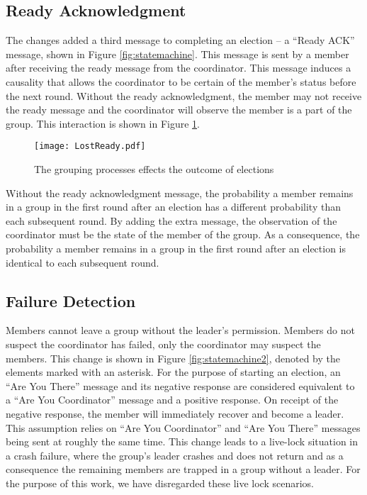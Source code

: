 \subsection{Ready Acknowledgment}

The changes added a third message to completing an election -- a ``Ready ACK'' message, shown in Figure \ref{fig:statemachine}.
This message is sent by a member after receiving the ready message from the coordinator.
This message induces a causality that allows the coordinator to be certain of the member's status before the next round.
Without the ready acknowledgment, the member may not receive the ready message and the coordinator will observe the member is a part of the group.
This interaction is shown in Figure \ref{fig:lostready}.

\begin{figure}
\texttt{[image: LostReady.pdf]}
\caption{The grouping processes effects the outcome of elections} \label{fig:lostready}
\end{figure}

Without the ready acknowledgment message, the probability a member remains in a group in the first round after an election has a different probability than each subsequent round.
By adding the extra message, the observation of the coordinator must be the state of the member of the group.
As a consequence, the probability a member remains in a group in the first round after an election is identical to each subsequent round.

\subsection{Failure Detection}

Members cannot leave a group without the leader's permission.
Members do not suspect the coordinator has failed, only the coordinator may suspect the members.
This change is shown in Figure \ref{fig:statemachine2}, denoted by the elements marked with an asterisk.
For the purpose of starting an election, an ``Are You There'' message and its negative response are considered equivalent to a ``Are You Coordinator'' message and a positive response.
On receipt of the negative response, the member will immediately recover and become a leader.
This assumption relies on ``Are You Coordinator'' and ``Are You There'' messages being sent at roughly the same time.
This change leads to a live-lock situation in a crash failure, where the group's leader crashes and does not return and as a consequence the remaining members are trapped in a group without a leader.
For the purpose of this work, we have disregarded these live lock scenarios.


